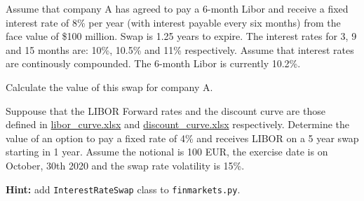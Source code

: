 \begin{question}
Assume that company A has agreed to pay a 6-month Libor and receive a fixed interest rate of 8\% per year (with interest payable every six months) from the face value of \$100 million. Swap is 1.25 years to expire. The interest rates for 3, 9 and 15 months are: 10\%, 10.5\% and 11\% respectively. Assume that interest rates are continously compounded. The 6-month Libor is currently 10.2\%. 

Calculate the value of this swap for company A.
\end{question}


%
%	
%	

\begin{question}
Suppouse that the LIBOR Forward rates and the discount curve are those defined in
\href{https://github.com/matteosan1/finance_course/raw/develop/libro/input_files/libor_curve.xlsx}{libor\_curve.xlsx} and \href{https://github.com/matteosan1/finance_course/raw/develop/libro/input_files/discount_curve.xlsx}{discount\_curve.xlsx} respectively.
Determine the value of an option to pay a fixed rate of 4\% and receives LIBOR on a 5 year swap starting in 1 year. Assume the notional is 100 EUR, the exercise date is on October, 30th 2020 and the swap rate volatility is 15\%.

\noindent\textbf{Hint:} add \texttt{InterestRateSwap} class to \texttt{finmarkets.py}.
\end{question}

